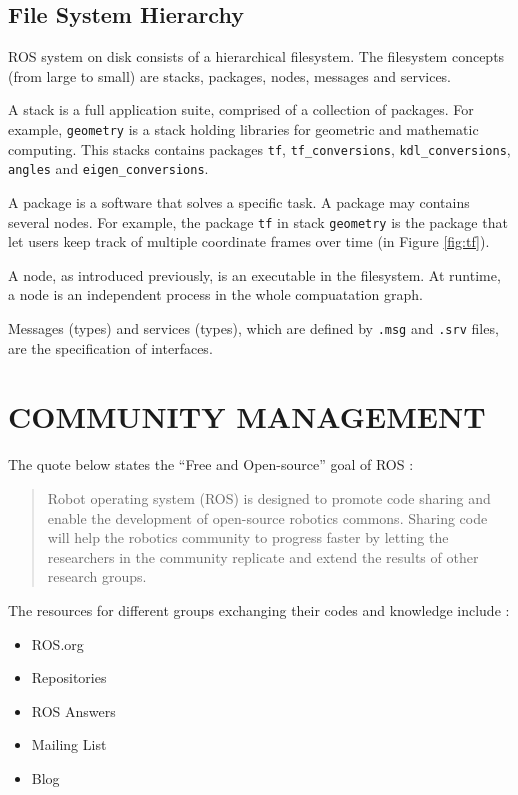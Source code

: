 \documentclass[a4paper, 10pt, conference]{ieeeconf}       %
\begin{document}
\subsection{File System Hierarchy}

ROS system on disk consists of a hierarchical filesystem. The filesystem concepts (from large to small) are stacks, packages, nodes, messages and services.

A stack is a full application suite, comprised of a collection of packages. For example, \texttt{geometry} is a stack holding libraries for geometric and mathematic computing. This stacks contains packages \texttt{tf}, \texttt{tf\_conversions}, \texttt{kdl\_conversions}, \texttt{angles} and \texttt{eigen\_conversions}.

A package is a software that solves a specific task. A package may contains several nodes. For example, the package \texttt{tf} in stack \texttt{geometry} is the package that let users keep track of multiple coordinate frames over time (in Figure \ref{fig:tf}).
  
A node, as introduced previously, is an executable in the filesystem. At runtime, a node is an independent process in the whole compuatation graph.

Messages (types) and services (types), which are defined by \texttt{.msg} and \texttt{.srv} files, are the specification of interfaces.

\section{COMMUNITY MANAGEMENT}

The quote below states the ``Free and Open-source'' goal of ROS\cite{cousins_sharing_2010} :
\begin{quote}
  Robot operating system (ROS) is designed to promote code sharing and enable the development of open-source robotics commons. Sharing code will help the robotics community to progress faster by letting the researchers in the community replicate and extend the results of other research groups. 
\end{quote}

The resources for different groups exchanging their codes and knowledge include :
\begin{itemize}
  \item ROS.org
  \item Repositories
  \item ROS Answers
  \item Mailing List
  \item Blog
\end{itemize}
\end{document}
